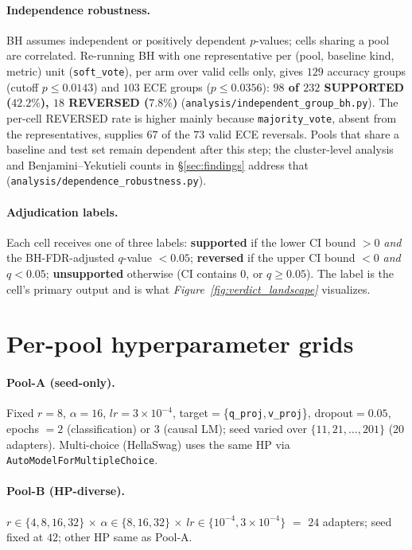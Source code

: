 \documentclass[11pt]{article}
\begin{document}
\paragraph{Independence robustness.} BH assumes independent or positively dependent $p$-values; cells sharing a pool are correlated. Re-running BH with one representative per (pool, baseline kind, metric) unit (\texttt{soft\_vote}), per arm over valid cells only, gives $129$ accuracy groups (cutoff $p{\leq}0.0143$) and $103$ ECE groups ($p{\leq}0.0356$): \textbf{$98$ of $232$ SUPPORTED ($42.2\%$), $18$ REVERSED ($7.8\%$)} (\texttt{analysis/\allowbreak independent\_\allowbreak group\_\allowbreak bh.\allowbreak py}). The per-cell REVERSED rate is higher mainly because \texttt{majority\_vote}, absent from the representatives, supplies $67$ of the $73$ valid ECE reversals. Pools that share a baseline and test set remain dependent after this step; the cluster-level analysis and Benjamini--Yekutieli counts in \S\ref{sec:findings} address that (\texttt{analysis/\allowbreak dependence\_\allowbreak robustness.\allowbreak py}).

\paragraph{Adjudication labels.} Each cell receives one of three labels: \textbf{supported} if the lower CI bound $>0$ \emph{and} the BH-FDR-adjusted $q$-value $<0.05$; \textbf{reversed} if the upper CI bound $<0$ \emph{and} $q{<}0.05$; \textbf{unsupported} otherwise (CI contains $0$, or $q{\geq}0.05$). The label is the cell's primary output and is what \emph{Figure~\ref{fig:verdict_landscape}} visualizes.

\section{Per-pool hyperparameter grids}\label{app:hp}
\paragraph{Pool-A (seed-only).} Fixed $r{=}8$, $\alpha{=}16$, $lr{=}3{\times}10^{-4}$, target$=$\{\texttt{q\_proj},\,\texttt{v\_proj}\}, dropout$=0.05$, epochs $=2$ (classification) or $3$ (causal LM); seed varied over $\{11, 21, \ldots, 201\}$ ($20$ adapters). Multi-choice (HellaSwag) uses the same HP via \texttt{AutoModelForMultipleChoice}.

\paragraph{Pool-B (HP-diverse).} $r{\in}\{4, 8, 16, 32\}$ $\times$ $\alpha{\in}\{8, 16, 32\}$ $\times$ $lr{\in}\{10^{-4}, 3{\times}10^{-4}\}$ $=$ $24$ adapters; seed fixed at $42$; other HP same as Pool-A.
\end{document}
